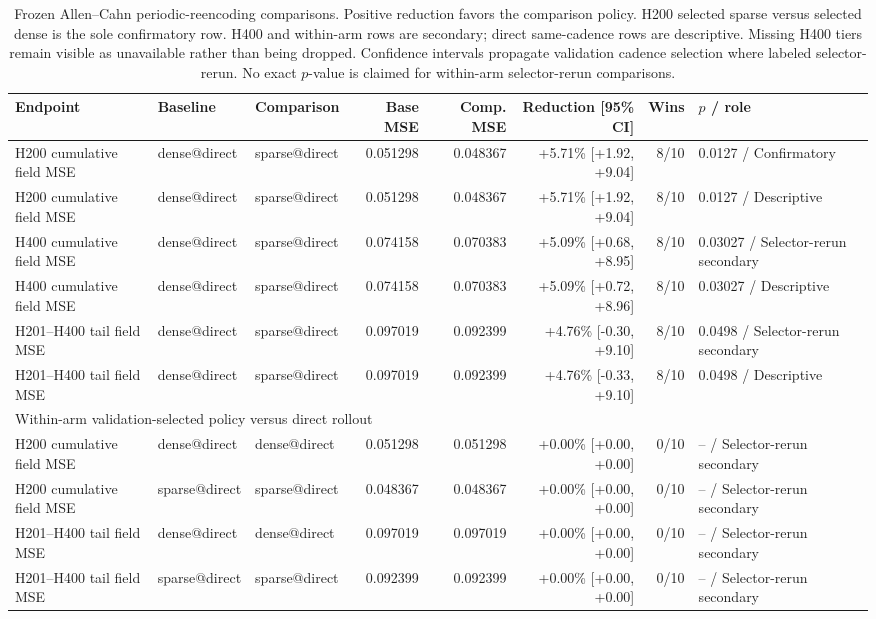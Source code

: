 \begin{table}[t]
\centering
\scriptsize
\caption{Frozen Allen--Cahn periodic-reencoding comparisons. Positive reduction favors the comparison policy. H200 selected sparse versus selected dense is the sole confirmatory row. H400 and within-arm rows are secondary; direct same-cadence rows are descriptive. Missing H400 tiers remain visible as unavailable rather than being dropped. Confidence intervals propagate validation cadence selection where labeled selector-rerun. No exact $p$-value is claimed for within-arm selector-rerun comparisons.}
\label{tab:allen_cahn_periodic_reencoding}
\begin{tabular}{lllrrrrl}
\toprule
Endpoint & Baseline & Comparison & Base MSE & Comp. MSE & Reduction [95\% CI] & Wins & $p$ / role \\
\midrule
H200 cumulative field MSE & dense@direct & sparse@direct & 0.051298 & 0.048367 & +5.71\% [+1.92, +9.04] & 8/10 & 0.0127 / Confirmatory \\
H200 cumulative field MSE & dense@direct & sparse@direct & 0.051298 & 0.048367 & +5.71\% [+1.92, +9.04] & 8/10 & 0.0127 / Descriptive \\
H400 cumulative field MSE & dense@direct & sparse@direct & 0.074158 & 0.070383 & +5.09\% [+0.68, +8.95] & 8/10 & 0.03027 / Selector-rerun secondary \\
H400 cumulative field MSE & dense@direct & sparse@direct & 0.074158 & 0.070383 & +5.09\% [+0.72, +8.96] & 8/10 & 0.03027 / Descriptive \\
H201--H400 tail field MSE & dense@direct & sparse@direct & 0.097019 & 0.092399 & +4.76\% [-0.30, +9.10] & 8/10 & 0.0498 / Selector-rerun secondary \\
H201--H400 tail field MSE & dense@direct & sparse@direct & 0.097019 & 0.092399 & +4.76\% [-0.33, +9.10] & 8/10 & 0.0498 / Descriptive \\
\midrule
\multicolumn{8}{l}{Within-arm validation-selected policy versus direct rollout} \\
\midrule
H200 cumulative field MSE & dense@direct & dense@direct & 0.051298 & 0.051298 & +0.00\% [+0.00, +0.00] & 0/10 & -- / Selector-rerun secondary \\
H200 cumulative field MSE & sparse@direct & sparse@direct & 0.048367 & 0.048367 & +0.00\% [+0.00, +0.00] & 0/10 & -- / Selector-rerun secondary \\
H201--H400 tail field MSE & dense@direct & dense@direct & 0.097019 & 0.097019 & +0.00\% [+0.00, +0.00] & 0/10 & -- / Selector-rerun secondary \\
H201--H400 tail field MSE & sparse@direct & sparse@direct & 0.092399 & 0.092399 & +0.00\% [+0.00, +0.00] & 0/10 & -- / Selector-rerun secondary \\
\bottomrule
\end{tabular}
\end{table}
